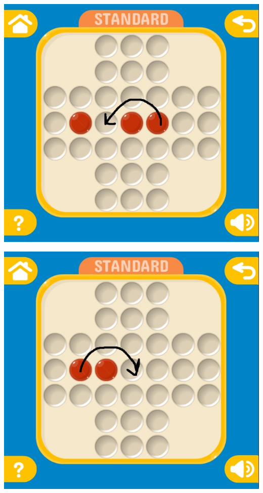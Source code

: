 \documentclass[10pt,a4paper]{report}
\begin{document}
\begin{center}
	\includegraphics[scale=.3]{19.jpg} \hspace{6cm}
	
	\includegraphics[scale=.3]{20.jpg} \hspace{6cm}
	

\end{center}
\end{document}
